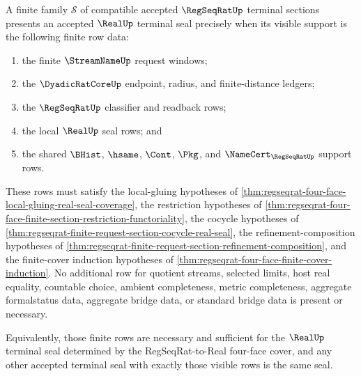 \begin{theorem}
\label{thm:regseqrat-four-face-finite-cover-normal-form}
A finite family $\mathcal{S}$ of compatible accepted $\RegSeqRatUp$ terminal
sections presents an accepted $\RealUp$ terminal seal precisely when its
visible support is the following finite row data:
\begin{enumerate}
\item the finite $\StreamNameUp$ request windows;
\item the $\DyadicRatCoreUp$ endpoint, radius, and finite-distance ledgers;
\item the $\RegSeqRatUp$ classifier and readback rows;
\item the local $\RealUp$ seal rows; and
\item the shared $\BHist$, $\hsame$, $\Cont$, $\Pkg$, and
$\NameCert_{\RegSeqRatUp}$ support rows.
\end{enumerate}
These rows must satisfy the local-gluing hypotheses of
\autoref{thm:regseqrat-four-face-local-gluing-real-seal-coverage}, the
restriction hypotheses of
\autoref{thm:regseqrat-four-face-finite-section-restriction-functoriality},
the cocycle hypotheses of
\autoref{thm:regseqrat-finite-request-section-cocycle-real-seal}, the
refinement-composition hypotheses of
\autoref{thm:regseqrat-finite-request-section-refinement-composition}, and
the finite-cover induction hypotheses of
\autoref{thm:regseqrat-four-face-finite-cover-induction}. No additional row
for quotient streams, selected limits, host real equality, countable choice,
ambient completeness, metric completeness, aggregate formalstatus data,
aggregate bridge data, or standard bridge data is present or necessary.

Equivalently, those finite rows are necessary and sufficient for the
$\RealUp$ terminal seal determined by the RegSeqRat-to-Real four-face cover,
and any other accepted terminal seal with exactly those visible rows is the
same seal.
\end{theorem}
